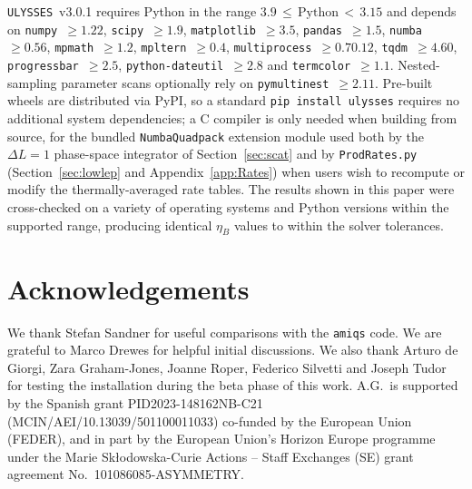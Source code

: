 \documentclass[12pt, a4paper]{article}
\begin{document}
\texttt{ULYSSES}~v3.0.1 requires Python in the range $3.9\,\le\,\text{Python}\,<\,3.15$ and depends on \texttt{numpy}~$\ge 1.22$, \texttt{scipy}~$\ge 1.9$, \texttt{matplotlib}~$\ge 3.5$, \texttt{pandas}~$\ge 1.5$, \texttt{numba}~$\ge 0.56$, \texttt{mpmath}~$\ge 1.2$, \texttt{mpltern}~$\ge 0.4$, \texttt{multiprocess}~$\ge 0.70.12$, \texttt{tqdm}~$\ge 4.60$, \texttt{progressbar}~$\ge 2.5$, \texttt{python-dateutil}~$\ge 2.8$ and \texttt{termcolor}~$\ge 1.1$. Nested-sampling parameter scans optionally rely on \texttt{pymultinest}~$\ge 2.11$. Pre-built wheels are distributed via PyPI, so a standard \texttt{pip install ulysses} requires no additional system dependencies; a C compiler is only needed when building from source, for the bundled \texttt{NumbaQuadpack} extension module used both by the $\Delta L = 1$ phase-space integrator of Section~\ref{sec:scat} and by \texttt{ProdRates.py} (Section~\ref{sec:lowlep} and Appendix~\ref{app:Rates}) when users wish to recompute or modify the thermally-averaged rate tables. The results shown in this paper were cross-checked on a variety of operating systems and Python versions within the supported range, producing identical $\eta_B$ values to within the solver tolerances.


\section*{Acknowledgements}
We thank Stefan Sandner for useful comparisons with the \texttt{amiqs} code. We are grateful to Marco Drewes for helpful initial discussions. We also thank Arturo de Giorgi, Zara Graham-Jones, Joanne Roper, Federico Silvetti and Joseph Tudor for testing the installation during the beta phase of this work.
A.G.~is supported by the Spanish grant PID2023-148162NB-C21 (MCIN/AEI/10.13039/501100011033) co-funded by the European Union (FEDER), and in part by the  
European Union's Horizon Europe programme under the Marie Skłodowska-Curie Actions – Staff Exchanges (SE) grant agreement No.~101086085-ASYMMETRY. 

\appendix
\end{document}
